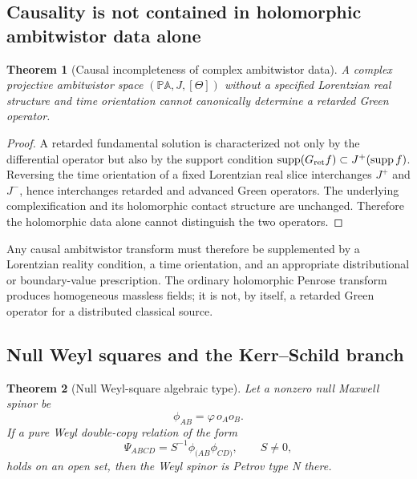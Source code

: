\documentclass[aps,prd,reprint,nofootinbib,superscriptaddress]{revtex4-2}
\newtheorem{theorem}{Theorem}[section]
\theoremstyle{definition}
\theoremstyle{remark}
\begin{document}
\subsection{Causality is not contained in holomorphic ambitwistor data alone}

\begin{theorem}[Causal incompleteness of complex ambitwistor data]
\label{thm:CausalNoGo}
A complex projective ambitwistor space $(\mathbb{PA},J,[\Theta])$ without a specified Lorentzian real structure and time orientation cannot canonically determine a retarded Green operator.
\end{theorem}

\begin{proof}
A retarded fundamental solution is characterized not only by the differential operator but also by the support condition $\operatorname{supp}(G_{\rm ret}f)\subset J^+(\operatorname{supp}f)$.  Reversing the time orientation of a fixed Lorentzian real slice interchanges $J^+$ and $J^-$, hence interchanges retarded and advanced Green operators.  The underlying complexification and its holomorphic contact structure are unchanged.  Therefore the holomorphic data alone cannot distinguish the two operators.
\end{proof}

Any causal ambitwistor transform must therefore be supplemented by a Lorentzian reality condition, a time orientation, and an appropriate distributional or boundary-value prescription.  The ordinary holomorphic Penrose transform produces homogeneous massless fields; it is not, by itself, a retarded Green operator for a distributed classical source.

\subsection{Null Weyl squares and the Kerr--Schild branch}

\begin{theorem}[Null Weyl-square algebraic type]
\label{thm:NullWeylTypeN}
Let a nonzero null Maxwell spinor be
\begin{equation}
 \phi_{AB}=\varphi\,o_Ao_B.
\end{equation}
If a pure Weyl double-copy relation of the form
\begin{equation}
 \Psi_{ABCD}=S^{-1}\phi_{(AB}\phi_{CD)},
 \qquad S\neq0,
 \label{eq:pureWDC}
\end{equation}
holds on an open set, then the Weyl spinor is Petrov type N there.
\end{theorem}
\end{document}
